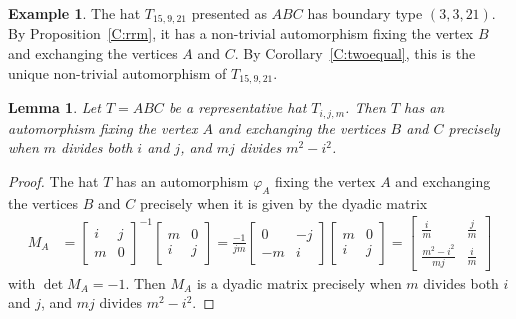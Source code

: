 \documentclass[12pt]{amsart}
\def\p{\varphi}
\theoremstyle{plain}
\newtheorem{lemma}[theorem]{Lemma}
\theoremstyle{definition}
\newtheorem{example}[theorem]{Example}
\numberwithin{equation}{section}
\begin{document}
\begin{example}
The hat $T_{15,9,21}$ presented as $ABC$ has boundary type $(3,3,21)$. By
Proposition~\ref{C:rrm}, it has a
non-trivial automorphism fixing the vertex $B$ and exchanging the vertices $A$ and $C$.
By Corollary~\ref{C:twoequal}, this is the unique non-trivial automorphism of $T_{15,9,21}$.
\end{example}



\begin{lemma}\label{L:autfixA}
Let $T = ABC$ be a representative hat $T_{i,j,m}$. Then $T$ has an automorphism fixing the
vertex $A$ and exchanging the vertices $B$ and $C$ precisely when $m$ divides both $i$ and $j$, and $mj$ divides $m^2 - i^2$.
\end{lemma}
\begin{proof}
The hat $T$ has an automorphism $\p_A$ fixing the vertex $A$ and exchanging the vertices $B$ and $C$ precisely when it is given by the dyadic matrix
\begin{align*}
M_A &=
	\begin{bmatrix}
		i&j\\
		m&0
	\end{bmatrix}^{-1}
	\begin{bmatrix}
		m&0\\
		i&j
	\end{bmatrix}
	= \frac{-1}{jm}	\begin{bmatrix}
		0&-j\\
		-m&i
	\end{bmatrix}
	\begin{bmatrix}
		m&0\\
		i&j
	\end{bmatrix} = 	
    \begin{bmatrix}
 \frac{i}{m}&\frac{j}{m}\\
\frac{m^2 - i^2}{mj}& \frac{i}{m}
\end{bmatrix}
\end{align*}
with $\det M_A = -1$. Then $M_A$ is a dyadic matrix precisely when $m$ divides both $i$ and $j$, and $mj$ divides $m^2 - i^2$.
\end{proof}
\end{document}
